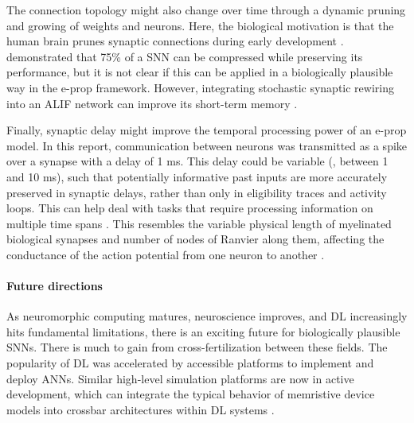     The connection topology might also change over time through a dynamic pruning and growing of weights and neurons.
    Here, the biological motivation is that the human brain prunes synaptic connections during early development \citep{huttenlocher1979synaptic}.
    \citet{elbez2020progressive} demonstrated that 75\% of a SNN can be compressed while preserving its performance, but it is not clear if this can be applied in a biologically plausible way in the e-prop framework.
    However, integrating stochastic synaptic rewiring \citep{kappel2018dynamic} into an ALIF network can improve its short-term memory \citep{bellec2020solution}.

    Finally, synaptic delay might improve the temporal processing power of an e-prop model.
    In this report, communication between neurons was transmitted as a spike over a synapse with a delay of 1 ms.
    This delay could be variable (\eg, between 1 and 10 ms), such that potentially informative past inputs are more accurately preserved in synaptic delays, rather than only in eligibility traces and activity loops.
    This can help deal with tasks that require processing information on multiple time spans \citep{jaeger2021dimensions}.
    This resembles the variable physical length of myelinated biological synapses and number of nodes of Ranvier along them, affecting the conductance of the action potential from one neuron to another \citep{bean2007action}.


\paragraph{Future directions}
    As neuromorphic computing matures, neuroscience improves, and DL increasingly hits fundamental limitations, there is an exciting future for biologically plausible SNNs.
    There is much to gain from cross-fertilization between these fields.
    The popularity of DL was accelerated by accessible platforms to implement and deploy ANNs.
    Similar high-level simulation platforms are now in active development, which can integrate the typical behavior of memristive device models into crossbar architectures within DL systems \citep{lammie2020memtorch}.

